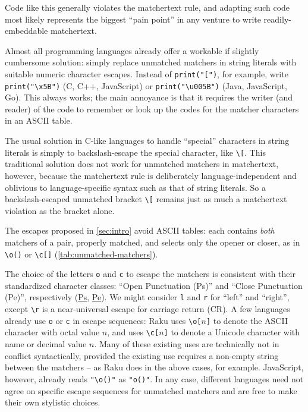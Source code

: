 Code like this generally violates the matchertext rule,
and adapting such code most likely represents the biggest ``pain point''
in any venture to write readily-embeddable matchertext.

Almost all programming languages already offer a workable
if slightly cumbersome solution:
simply replace unmatched matchers in string literals
with suitable numeric character escapes.
Instead of \verb|print("[")|, for example,
write \verb|print("\x5B")| (C, C++, JavaScript)
or \verb|print("\u005B")| (Java, JavaScript, Go).
This always works;
the main annoyance is that it requires the writer (and reader) of the code
to remember or look up the codes for the matcher characters in an ASCII table.

The usual solution in C-like languages
to handle ``special'' characters in string literals
is simply to backslash-escape the special character,
like \verb|\[|.
This traditional solution does not work for unmatched matchers in matchertext,
however,
because the matchertext rule is deliberately language-independent
and oblivious to language-specific syntax such as that of string literals.
So a backslash-escaped unmatched bracket \verb|\[|
remains just as much a matchertext violation as the bracket alone.

The escapes proposed in \cref{sec:intro} avoid ASCII tables:
each contains \emph{both} matchers of a pair, properly matched,
and selects only the opener or closer,
as in \verb|\o()| or \verb|\c[]| (\cref{tab:unmatched-matchers}).

The choice of the letters \verb|o| and \verb|c| to escape the matchers
is consistent with their standardized character classes:
``Open Punctuation (Ps)'' and ``Close Punctuation (Pe)'', respectively
(\href{https://www.compart.com/en/unicode/category/Ps}{Ps},
\href{https://www.compart.com/en/unicode/category/Pe}{Pe}).
We might consider \verb|l| and \verb|r| for ``left'' and ``right'',
except \verb|\r| is a near-universal escape for carriage return (CR).
A few languages already use \verb|o| or \verb|c| in escape sequences:
\eg Raku uses \verb|\o[|$n$\verb|]|
to denote the ASCII character with octal value $n$,
and uses \verb|\c[|$n$\verb|]|
to denote a Unicode character with name or decimal value $n$.
Many of these existing uses are technically not in conflict syntactically,
provided the existing use requires a non-empty string between the matchers --
as Raku does in the above cases, for example.
JavaScript, however, already reads \verb|"\o()"| as \verb|"o()"|.
In any case, different languages need not agree
on specific escape sequences for unmatched matchers
and are free to make their own stylistic choices.


